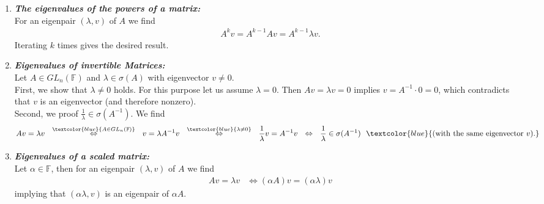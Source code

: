 {
	\color{solution}
\begin{enumerate}
	\item  \textbf{\textit{The eigenvalues of the powers of a matrix:}}\\
	For an eigenpair $(\lambda,v)$ of $A$ we find
 \begin{align*}
 A^kv = A^{k-1}Av =  A^{k-1}\lambda v.
 \end{align*}
 Iterating $k$ times gives the desired result.
	\item	\textbf{\textit{Eigenvalues of invertible Matrices:}}\\ 
	 Let $A\in GL_n(\mathbb{F})$ and $\lambda\in\sigma(A)$ with eigenvector $v\neq 0$.\\
	First, we show that $\lambda\neq 0$ holds. For this purpose let us assume $\lambda = 0$. Then
	$Av=\lambda v=0$ implies $v=A^{-1}\cdot 0=0$, which contradicts that $v$ is an eigenvector (and therefore nonzero).\\
	Second, we proof $\frac{1}{\lambda}\in\sigma(A^{-1})$. We find
	\begin{align*}Av=\lambda v~~\stackrel{\textcolor{blue}{A\in GL_n(\mathbb{F})}}{\Leftrightarrow}~~ v = \lambda A^{-1}v~~\stackrel{\textcolor{blue}{\lambda\neq 0}}{\Leftrightarrow}~~\frac{1}{\lambda}v=A^{-1}v~~\Leftrightarrow~~\frac{1}{\lambda}\in\sigma(A^{-1})~~\textcolor{blue}{(\text{with the same eigenvector}~v).}
	\end{align*}
%
%
%
	\item \textbf{\textit{Eigenvalues of a scaled matrix:}}\\
	Let $\alpha \in \mathbb{F}$, then for an eigenpair $(\lambda,v)$ of $A$ we find
	\begin{align*}
	Av = \lambda v & \Leftrightarrow (\alpha A) v = (\alpha \lambda)  v
	\end{align*} 
	implying that $(\alpha \lambda, v)$ is an eigenpair of $\alpha A$. \\ 


\end{enumerate}}
